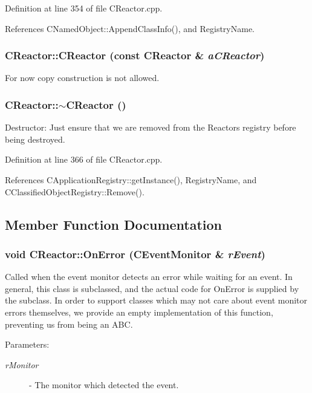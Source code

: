 Definition at line 354 of file CReactor.cpp.

References CNamed\-Object::Append\-Class\-Info(), and Registry\-Name.
\subsubsection{\setlength{\rightskip}{0pt plus 5cm}CReactor::CReactor (const CReactor \& {\em a\-CReactor})\hspace{0.3cm}{\tt  [private]}}\label{classCReactor_c0}


For now copy construction is not allowed.

\subsubsection{\setlength{\rightskip}{0pt plus 5cm}CReactor::$\sim$CReactor ()\hspace{0.3cm}{\tt  [virtual]}}\label{classCReactor_a3}


Destructor: Just ensure that we are removed from the Reactors registry before being destroyed. 

Definition at line 366 of file CReactor.cpp.

References CApplication\-Registry::get\-Instance(), Registry\-Name, and CClassified\-Object\-Registry::Remove().

\subsection{Member Function Documentation}
\subsubsection{\setlength{\rightskip}{0pt plus 5cm}void CReactor::On\-Error ({\bf CEvent\-Monitor} \& {\em r\-Event})\hspace{0.3cm}{\tt  [virtual]}}\label{classCReactor_a7}


Called when the event monitor detects an error while waiting for an event. In general, this class is subclassed, and the actual code for On\-Error is supplied by the subclass. In order to support classes which may not care about event monitor errors themselves,  we provide an empty implementation of this function, preventing us from being an ABC.\begin{Desc}
\item[Parameters: ]\par
\begin{description}
\item[{\em 
r\-Monitor}]- The monitor which detected the event. \end{description}
\end{Desc}


